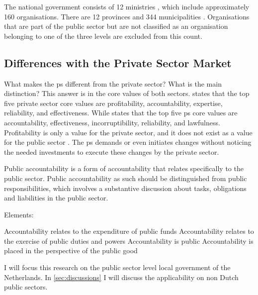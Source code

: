 The national government consists of 12 ministries \parencite{Rijksoverheid}, which include approximately 160 organisations. There are 12 provinces \parencite{Overheidsvormen} and 344 municipalities \parencite{Herindeling}. Organisations that are part of the public sector but are not classified as an organisation belonging to one of the three levels are excluded from this count. 


\subsection{Differences with the Private Sector Market}
\label{sub:tbdifferenceprivatesector}
What makes the \gls{ps} different from the private sector? What is the main distinction? This answer is in the core values of both sectors. \Textcite{Wal2008} states that the top five private sector core values are profitability, accountability, expertise, reliability, and effectiveness. While \textcite{Wal2008} states that the top five \gls{ps} core values are accountability, effectiveness, incorruptibility, reliability, and lawfulness. Profitability is only a value for the private sector, and it does not exist as a value for the public sector \parencite{Wal2008}. The \gls{ps} demands or even initiates changes without noticing the needed investments to execute these changes by the private sector.



Public accountability is a form of accountability that relates specifically to the public sector. Public accountability as such should be distinguished from public responsibilities, which involves a substantive discussion about tasks, obligations and liabilities in the public sector.

Elements:

Accountability relates to the expenditure of public funds
Accountability relates to the exercise of public duties and powers
Accountability is public
Accountability is placed in the perspective of the public good




I will focus this research on the public sector level local government of the Netherlands. In \cref{sec:discussions} I will discuss the applicability on non Dutch public sectors.



